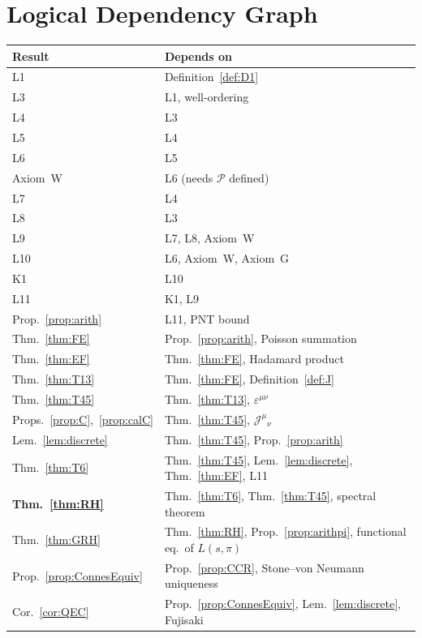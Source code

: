 \documentclass[12pt,a4paper]{article}
\theoremstyle{remark}
\begin{document}
\section{Logical Dependency Graph}
\label{app:graph}

\begin{center}
\begin{tabular}{ll}
\toprule
\textbf{Result} & \textbf{Depends on}\\
\midrule
L1 & Definition~\ref{def:D1}\\
L3 & L1, well-ordering\\
L4 & L3\\
L5 & L4\\
L6 & L5\\
Axiom~W & L6 (needs $\mathcal{P}$ defined)\\
L7 & L4\\
L8 & L3\\
L9 & L7, L8, Axiom~W\\
L10 & L6, Axiom~W, Axiom~G\\
K1 & L10\\
L11 & K1, L9\\
Prop.~\ref{prop:arith} & L11, PNT bound\\
Thm.~\ref{thm:FE} & Prop.~\ref{prop:arith}, Poisson summation\\
Thm.~\ref{thm:EF} & Thm.~\ref{thm:FE}, Hadamard product\\
\midrule
Thm.~\ref{thm:T13} & Thm.~\ref{thm:FE}, Definition~\ref{def:J}\\
Thm.~\ref{thm:T45} & Thm.~\ref{thm:T13}, $\varepsilon^{\mu\nu}$\\
Props.~\ref{prop:C},~\ref{prop:calC} & Thm.~\ref{thm:T45}, $\mathcal{J}^\mu{}_\nu$\\
Lem.~\ref{lem:discrete} & Thm.~\ref{thm:T45}, Prop.~\ref{prop:arith}\\
Thm.~\ref{thm:T6} & Thm.~\ref{thm:T45}, Lem.~\ref{lem:discrete}, Thm.~\ref{thm:EF}, L11\\
\midrule
\textbf{Thm.~\ref{thm:RH}} & Thm.~\ref{thm:T6}, Thm.~\ref{thm:T45}, spectral theorem\\
Thm.~\ref{thm:GRH} & Thm.~\ref{thm:RH}, Prop.~\ref{prop:arithpi}, functional eq.\ of $L(s,\pi)$\\
Prop.~\ref{prop:ConnesEquiv} & Prop.~\ref{prop:CCR}, Stone--von Neumann uniqueness\\
Cor.~\ref{cor:QEC} & Prop.~\ref{prop:ConnesEquiv}, Lem.~\ref{lem:discrete}, Fujisaki\\
\bottomrule
\end{tabular}
\end{center}
\end{document}
